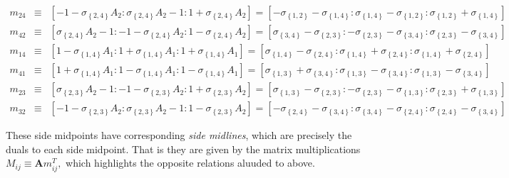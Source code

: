 \documentclass[11pt]{article}
\begin{document}
\begin{eqnarray*}
m_{24} &\equiv &\left[ -1-\sigma _{\left\{ 2,4\right\} }A_{2}:\sigma
_{\left\{ 2,4\right\} }A_{2}-1:1+\sigma _{\left\{ 2,4\right\} }A_{2}\right] =%
\left[ -\sigma _{\left\{ 1,2\right\} }-\sigma _{\left\{ 1,4\right\} }:\sigma
_{\left\{ 1,4\right\} }-\sigma _{\left\{ 1,2\right\} }:\sigma _{\left\{
1,2\right\} }+\sigma _{\left\{ 1,4\right\} }\right]  \\
m_{42} &\equiv &\left[ \sigma _{\left\{ 2,4\right\} }A_{2}-1:-1-\sigma
_{\left\{ 2,4\right\} }A_{2}:1-\sigma _{\left\{ 2,4\right\} }A_{2}\right] =%
\left[ \sigma _{\left\{ 3,4\right\} }-\sigma _{\left\{ 2,3\right\} }:-\sigma
_{\left\{ 2,3\right\} }-\sigma _{\left\{ 3,4\right\} }:\sigma _{\left\{
2,3\right\} }-\sigma _{\left\{ 3,4\right\} }\right]  \\
m_{14} &\equiv &\left[ 1-\sigma _{\left\{ 1,4\right\} }A_{1}:1+\sigma
_{\left\{ 1,4\right\} }A_{1}:1+\sigma _{\left\{ 1,4\right\} }A_{1}\right] =%
\left[ \sigma _{\left\{ 1,4\right\} }-\sigma _{\left\{ 2,4\right\} }:\sigma
_{\left\{ 1,4\right\} }+\sigma _{\left\{ 2,4\right\} }:\sigma _{\left\{
1,4\right\} }+\sigma _{\left\{ 2,4\right\} }\right]  \\
m_{41} &\equiv &\left[ 1+\sigma _{\left\{ 1,4\right\} }A_{1}:1-\sigma
_{\left\{ 1,4\right\} }A_{1}:1-\sigma _{\left\{ 1,4\right\} }A_{1}\right] =%
\left[ \sigma _{\left\{ 1,3\right\} }+\sigma _{\left\{ 3,4\right\} }:\sigma
_{\left\{ 1,3\right\} }-\sigma _{\left\{ 3,4\right\} }:\sigma _{\left\{
1,3\right\} }-\sigma _{\left\{ 3,4\right\} }\right]  \\
m_{23} &\equiv &\left[ \sigma _{\left\{ 2,3\right\} }A_{2}-1:-1-\sigma
_{\left\{ 2,3\right\} }A_{2}:1+\sigma _{\left\{ 2,3\right\} }A_{2}\right] =%
\left[ \sigma _{\left\{ 1,3\right\} }-\sigma _{\left\{ 2,3\right\} }:-\sigma
_{\left\{ 2,3\right\} }-\sigma _{\left\{ 1,3\right\} }:\sigma _{\left\{
2,3\right\} }+\sigma _{\left\{ 1,3\right\} }\right]  \\
m_{32} &\equiv &\left[ -1-\sigma _{\left\{ 2,3\right\} }A_{2}:\sigma
_{\left\{ 2,3\right\} }A_{2}-1:1-\sigma _{\left\{ 2,3\right\} }A_{2}\right] =%
\left[ -\sigma _{\left\{ 2,4\right\} }-\sigma _{\left\{ 3,4\right\} }:\sigma
_{\left\{ 3,4\right\} }-\sigma _{\left\{ 2,4\right\} }:\sigma _{\left\{
2,4\right\} }-\sigma _{\left\{ 3,4\right\} }\right] 
\end{eqnarray*}

These side midpoints have corresponding \textit{side midlines}, which are
precisely the duals to each side midpoint. That is they are given by the
matrix multiplications $M_{ij}\equiv \mathbf{A}m_{ij}^{T},$ which highlights
the opposite relations aluuded to above.
\end{document}
